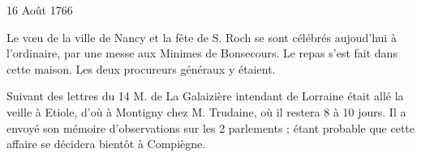                     \begin{diary}{16 Août 1766}{}

                         Le vœu de la
                              ville de Nancy et la fête de S. Roch
                           se sont célébrés aujoud'hui à l'ordinaire, par
                           une messe aux Minimes de
                              Bonsecours. Le repas
                           s'est fait dans cette maison. Les deux procureurs
                           généraux y étaient. \bigskip


                         Suivant des lettres du 14
                           M. de La Galaizière
                           intendant
                           de Lorraine était allé la veille à Etiole, d'où à
                           Montigny
                           chez
                           M. Trudaine, où il restera 8 à 10
                           jours. Il a envoyé son mémoire
                              d'observations
                              sur les 2 parlements ; étant probable que cette
                           affaire se décidera bientôt à Compiègne. \bigskip


                     \end{diary}

